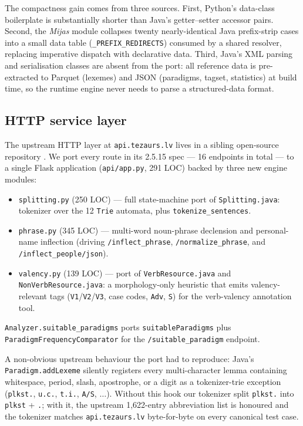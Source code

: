 \documentclass[11pt,a4paper]{article}
\begin{document}
The compactness gain comes from three sources. First, Python's
data-class boilerplate is substantially shorter than Java's
getter--setter accessor pairs. Second, the \textit{Mijas} module
collapses twenty nearly-identical Java prefix-strip cases into a
small data table (\texttt{\_PREFIX\_REDIRECTS}) consumed by a shared
resolver, replacing imperative dispatch with declarative data.
Third, Java's XML parsing and serialisation classes are absent from
the port: all reference data is pre-extracted to Parquet (lexemes)
and JSON (paradigms, tagset, statistics) at build time, so the
runtime engine never needs to parse a structured-data format.

\subsection{HTTP service layer}

The upstream HTTP layer at \texttt{api.tezaurs.lv} lives in a sibling
open-source repository \cite{lumii_webservices}. We port every route in
its 2.5.15 spec --- 16 endpoints in total --- to a single Flask
application (\texttt{api/app.py}, 291 LOC) backed by three new engine
modules:
\begin{itemize}
\item \texttt{splitting.py} (250 LOC) --- full state-machine port of
  \texttt{Splitting.java}: tokenizer over the 12 \texttt{Trie}
  automata, plus \texttt{tokenize\_sentences}.
\item \texttt{phrase.py} (345 LOC) --- multi-word noun-phrase
  declension and personal-name inflection (driving
  \texttt{/inflect\_phrase}, \texttt{/normalize\_phrase}, and
  \texttt{/inflect\_people/json}).
\item \texttt{valency.py} (139 LOC) --- port of
  \texttt{VerbResource.java} and \texttt{NonVerbResource.java}: a
  morphology-only heuristic that emits valency-relevant tags
  (\texttt{V1}/\texttt{V2}/\texttt{V3}, case codes, \texttt{Adv},
  \texttt{S}) for the verb-valency annotation tool.
\end{itemize}
\noindent
\texttt{Analyzer.suitable\_paradigms} ports \texttt{suitableParadigms}
plus \texttt{ParadigmFrequencyComparator} for the
\texttt{/suitable\_paradigm} endpoint.

A non-obvious upstream behaviour the port had to reproduce: Java's
\texttt{Paradigm.addLexeme} silently registers every multi-character
lemma containing whitespace, period, slash, apostrophe, or a digit as a
tokenizer-trie exception (\texttt{plkst.}, \texttt{u.c.},
\texttt{t.i.}, \texttt{A/S}, $\dots$). Without this hook our
tokenizer split \texttt{plkst.} into \texttt{plkst} + \texttt{.}; with
it, the upstream 1{,}622-entry abbreviation list is honoured and the
tokenizer matches \texttt{api.tezaurs.lv} byte-for-byte on every
canonical test case.
\end{document}
